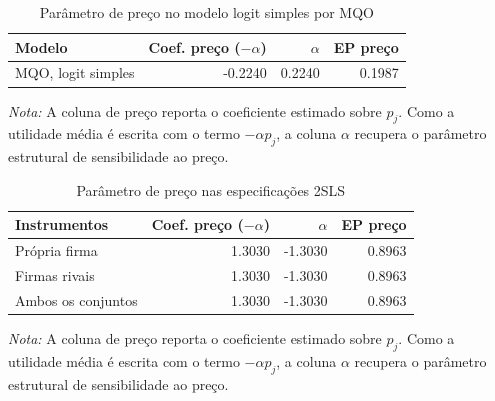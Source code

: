 



\begingroup
\begin{table}[H]
\centering
\caption{Parâmetro de preço no modelo logit simples por MQO}
\label{tab:preco-logit-simples}
\small
\begin{tabular}{lrrr}
\toprule
Modelo & Coef. preço ($-\alpha$) & $\alpha$ & EP preço \\
\midrule
MQO, logit simples & -0.2240 & 0.2240 & 0.1987 \\
\bottomrule
\end{tabular}

\vspace{0.3em}
\footnotesize
\textit{Nota:} A coluna de preço reporta o coeficiente estimado sobre $p_j$. Como a utilidade média é escrita com o termo $-\alpha p_j$, a coluna $\alpha$ recupera o parâmetro estrutural de sensibilidade ao preço.
\end{table}
\endgroup


\begingroup
\begin{table}[H]
\centering
\caption{Parâmetro de preço nas especificações 2SLS}
\label{tab:preco-2sls}
\small
\begin{tabular}{lrrr}
\toprule
Instrumentos & Coef. preço ($-\alpha$) & $\alpha$ & EP preço \\
\midrule
Própria firma & 1.3030 & -1.3030 & 0.8963 \\
Firmas rivais & 1.3030 & -1.3030 & 0.8963 \\
Ambos os conjuntos & 1.3030 & -1.3030 & 0.8963 \\
\bottomrule
\end{tabular}

\vspace{0.3em}
\footnotesize
\textit{Nota:} A coluna de preço reporta o coeficiente estimado sobre $p_j$. Como a utilidade média é escrita com o termo $-\alpha p_j$, a coluna $\alpha$ recupera o parâmetro estrutural de sensibilidade ao preço.
\end{table}
\endgroup

